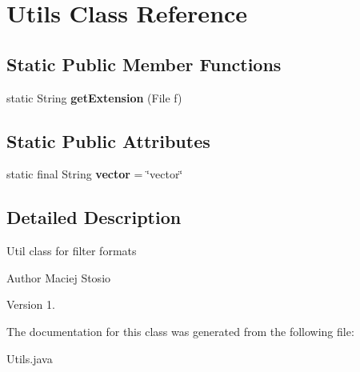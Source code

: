 \hypertarget{class_utils}{}\section{Utils Class Reference}
\label{class_utils}
\subsection*{Static Public Member Functions}
\begin{DoxyCompactItemize}
\item 
\mbox{\label{class_utils_a80584b7ec64ec0233d7c6f1846cd94a5}} 
static String {\bfseries get\+Extension} (File f)
\end{DoxyCompactItemize}
\subsection*{Static Public Attributes}
\begin{DoxyCompactItemize}
\item 
\mbox{\label{class_utils_ac9fd6f8e1bccc37a6cd3863c0d17201b}} 
static final String {\bfseries vector} = \char`\"{}vector\char`\"{}
\end{DoxyCompactItemize}


\subsection{Detailed Description}
Util class for filter formats \begin{DoxyAuthor}{Author}
Maciej Stosio 
\end{DoxyAuthor}
\begin{DoxyVersion}{Version}
1. 
\end{DoxyVersion}


The documentation for this class was generated from the following file\+:\begin{DoxyCompactItemize}
\item 
Utils.\+java\end{DoxyCompactItemize}
